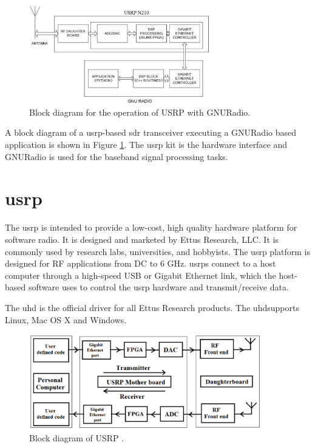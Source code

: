 \begin{figure}
  \centering
  \includegraphics[width=0.7\textwidth]{../images/usrpGNURadioBlock}
  \caption[USRP operation with GNURadio]{Block diagram for the operation of USRP
  with GNURadio.}
  \label{usrpGNURadioBlock}
\end{figure}

A block diagram of a \gls{usrp}-based \gls{sdr} transceiver executing a GNURadio based 
application is shown in Figure \ref{usrpGNURadioBlock}. The \gls{usrp} kit is the 
hardware interface and GNURadio is used for the baseband signal processing
tasks.


\section{\gls{usrp}}

The \gls{usrp} is intended to provide a 
low-cost, high quality hardware platform for software radio. It is designed
and marketed by Ettus Research, LLC. It is commonly used by research labs,
universities, and hobbyists. The \gls{usrp} platform is designed for RF applications
from DC to 6 GHz. \gls{usrp}s connect to a host computer through a high-speed USB or
Gigabit Ethernet link, which the host-based software uses to control the \gls{usrp}
hardware and transmit/receive data.

The \gls{uhd} is the official driver for all Ettus Research
products. The \gls{uhd}supports Linux, Mac OS X and Windows.

\begin{figure}
\centering
\includegraphics[width=0.9\textwidth]{../images/usrpBlock}
\caption[Block diagram of USRP]{Block diagram of USRP
\protect\cite{kranthi13}.}
\label{usrpBlock}
\end{figure}


